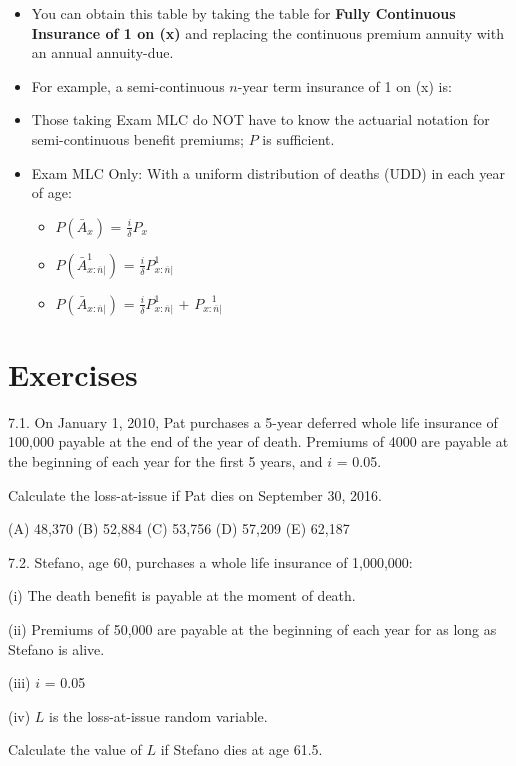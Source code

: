 \documentclass[]{book}
\begin{document}
\begin{itemize}
\item
  You can obtain this table by taking the table for \textbf{Fully
  Continuous Insurance of 1 on (x)} and replacing the continuous premium
  annuity with an annual annuity-due.
\item
  For example, a semi-continuous \(n\)-year term insurance of 1 on (x)
  is:
\item
  Those taking Exam MLC do NOT have to know the actuarial notation for
  semi-continuous benefit premiums; \(P\) is sufficient.
\item
  Exam MLC Only: With a uniform distribution of deaths (UDD) in each
  year of age:

  \begin{itemize}
  \item
    \(P(\bar{A}_x)\) = \(\frac{i}{\delta}\)\(P_x\)
  \item
    \(P(\bar{A}_{x:\overline{n}|}^{1})\) =
    \(\frac{i}{\delta}\)\({P}_{x:\overline{n}|}^{1}\)
  \item
    \(P(\bar{A}_{x:\overline{n}|})\) =
    \(\frac{i}{\delta}\)\({P}_{x:\overline{n}|}^{1}\) +
    \({P}_{x:\overline{n}|}^{~~~~1}\)
  \end{itemize}
\end{itemize}

\section{Exercises}\label{exercises-4}

7.1. On January 1, 2010, Pat purchases a 5-year deferred whole life
insurance of 100,000 payable at the end of the year of death. Premiums
of 4000 are payable at the beginning of each year for the first 5 years,
and \(i\) = 0.05.

Calculate the loss-at-issue if Pat dies on September 30, 2016.

(A) 48,370 (B) 52,884 (C) 53,756 (D) 57,209 (E) 62,187

7.2. Stefano, age 60, purchases a whole life insurance of 1,000,000:

(i) The death benefit is payable at the moment of death.

(ii) Premiums of 50,000 are payable at the beginning of each year for as
long as Stefano is alive.

(iii) \(i\) = 0.05

(iv) \(L\) is the loss-at-issue random variable.

Calculate the value of \(L\) if Stefano dies at age 61.5.
\end{document}
